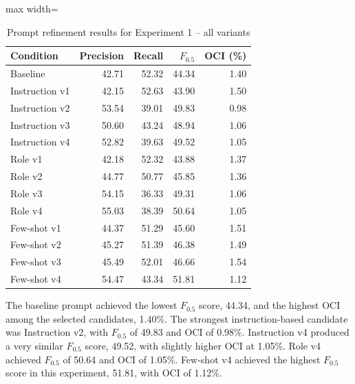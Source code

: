 \begin{table}[htbp]
    \centering
    \caption{Prompt refinement results for Experiment 1 -- all variants}
    \label{tab:exp1_prompt_refinement}
    \renewcommand{\arraystretch}{1.15}
    \begin{adjustbox}{max width=\textwidth}
    \begin{tabular}{lrrrr}
        \toprule
        \textbf{Condition} & \textbf{Precision} & \textbf{Recall} & \textbf{$F_{0.5}$} & \textbf{OCI (\%)} \\
        \midrule
        Baseline       & 42.71 & 52.32 & 44.34 & 1.40 \\
        \addlinespace
        Instruction v1 & 42.15 & 52.63 & 43.90 & 1.50 \\
        Instruction v2 & 53.54 & 39.01 & 49.83 & 0.98 \\
        Instruction v3 & 50.60 & 43.24 & 48.94 & 1.06 \\
        Instruction v4 & 52.82 & 39.63 & 49.52 & 1.05 \\
        \addlinespace
        Role v1        & 42.18 & 52.32 & 43.88 & 1.37 \\
        Role v2        & 44.77 & 50.77 & 45.85 & 1.36 \\
        Role v3        & 54.15 & 36.33 & 49.31 & 1.06 \\
        Role v4        & 55.03 & 38.39 & 50.64 & 1.05 \\
        \addlinespace
        Few-shot v1    & 44.37 & 51.29 & 45.60 & 1.51 \\
        Few-shot v2    & 45.27 & 51.39 & 46.38 & 1.49 \\
        Few-shot v3    & 45.49 & 52.01 & 46.66 & 1.54 \\
        Few-shot v4    & 54.47 & 43.34 & 51.81 & 1.12 \\
        \bottomrule
    \end{tabular}
    \end{adjustbox}
\end{table}

The baseline prompt achieved the lowest $F_{0.5}$ score, 44.34, and the highest OCI among the selected candidates, 1.40\%. The strongest instruction-based candidate was Instruction v2, with $F_{0.5}$ of 49.83 and OCI of 0.98\%. Instruction v4 produced a very similar $F_{0.5}$ score, 49.52, with slightly higher OCI at 1.05\%. Role v4 achieved $F_{0.5}$ of 50.64 and OCI of 1.05\%. Few-shot v4 achieved the highest $F_{0.5}$ score in this experiment, 51.81, with OCI of 1.12\%.

